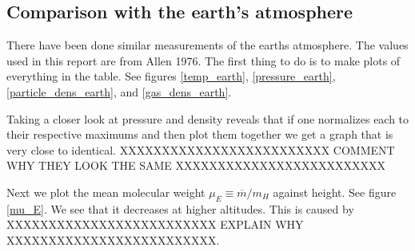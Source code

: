 \documentclass{aa}   %
\begin{document}
\subsection{Comparison with the earth's atmosphere}
There have been done similar measurements of the earths atmosphere. The values used in this report are from Allen 1976. 
The first thing to do is to make plots of everything in the table. See figures \ref{temp_earth}, \ref{pressure_earth}, \ref{particle_dens_earth}, and \ref{gas_dens_earth}.





Taking a closer look at pressure and density reveals that if one normalizes each to their respective maximums and then plot them together we get a graph that is very close to identical.
XXXXXXXXXXXXXXXXXXXXXXXXX COMMENT WHY THEY LOOK THE SAME XXXXXXXXXXXXXXXXXXXXXXXXX

Next we plot the mean molecular weight $\mu_E \equiv \overline{m}/m_H$ against height. See figure \ref{mu_E}. We see that it decreases at higher altitudes. This is caused by XXXXXXXXXXXXXXXXXXXXXXXXX EXPLAIN WHY XXXXXXXXXXXXXXXXXXXXXXXXX.
\end{document}
